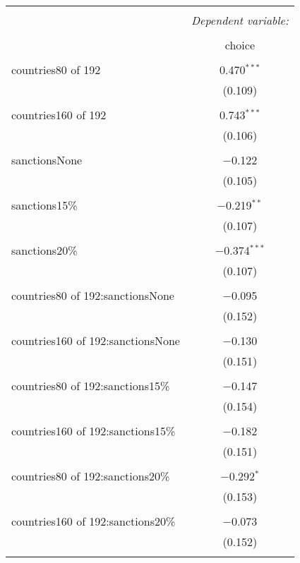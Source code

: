 \documentclass{article}
\begin{document}
\begin{table}[H] \centering 
  \caption{} 
  \label{} 
\begin{tabular}{@{\extracolsep{5pt}}lc} 
\\[-1.8ex]\hline 
\hline \\[-1.8ex] 
 & \multicolumn{1}{c}{\textit{Dependent variable:}} \\ 
\cline{2-2} 
\\[-1.8ex] & choice \\ 
\hline \\[-1.8ex] 
 countries80 of 192 & 0.470$^{***}$ \\ 
  & (0.109) \\ 
  & \\ 
 countries160 of 192 & 0.743$^{***}$ \\ 
  & (0.106) \\ 
  & \\ 
 sanctionsNone & $-$0.122 \\ 
  & (0.105) \\ 
  & \\ 
 sanctions15\% & $-$0.219$^{**}$ \\ 
  & (0.107) \\ 
  & \\ 
 sanctions20\% & $-$0.374$^{***}$ \\ 
  & (0.107) \\ 
  & \\ 
 countries80 of 192:sanctionsNone & $-$0.095 \\ 
  & (0.152) \\ 
  & \\ 
 countries160 of 192:sanctionsNone & $-$0.130 \\ 
  & (0.151) \\ 
  & \\ 
 countries80 of 192:sanctions15\% & $-$0.147 \\ 
  & (0.154) \\ 
  & \\ 
 countries160 of 192:sanctions15\% & $-$0.182 \\ 
  & (0.151) \\ 
  & \\ 
 countries80 of 192:sanctions20\% & $-$0.292$^{*}$ \\ 
  & (0.153) \\ 
  & \\ 
 countries160 of 192:sanctions20\% & $-$0.073 \\ 
  & (0.152) \\ 
  & \\ 

\end{tabular}
\end{table}
\end{document}
